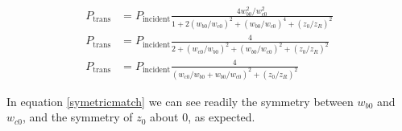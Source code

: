 \begin{align}
    P_{\mathrm{trans}}  &= P_{\mathrm{incident}} \frac{4 w_{b0}^2 / w_{c0}^2}{1 +
    2 \left( w_{b0} /w_{c0} \right)^2 + \left( w_{b0} /w_{c0} \right)^4 + \left(
    z_0 / z_R \right)^2} \nonumber
\\  P_{\mathrm{trans}}  &= P_{\mathrm{incident}} \frac{4}{ 2 + \left( w_{c0} /
    w_{b0} \right)^2 + \left( w_{b0} /w_{c0} \right)^2 + \left(
    z_0 / z_R \right)^2}
\\  P_{\mathrm{trans}}  &= P_{\mathrm{incident}} \frac{4}{ \left( w_{c0} /
    w_{b0} + w_{b0} / w_{c0} \right)^2 + \left( z_0 / z_R \right)^2}
    \label{symetricmatch}
\end{align}

In equation \ref{symetricmatch} we can see readily the symmetry between
$w_{b0}$ and $w_{c0}$, and the symmetry of $z_0$ about $0$, as expected.

